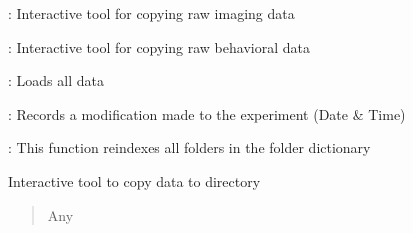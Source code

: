 \documentclass[letterpaper,10pt,english]{sphinxmanual}
\begin{document}
\begin{fulllineitems}
\begin{description}
\begin{DUlineblock}{0em}
\item[]  : Interactive tool for copying raw imaging data
\item[]  : Interactive tool for copying raw behavioral data
\item[]  : Loads all data
\item[]  :  Records a modification made to the experiment (Date \& Time)
\item[]  : This function re\sphinxhyphen{}indexes all folders in the folder dictionary
\end{DUlineblock}

\end{description}

\begin{fulllineitems}
\label{\detokenize{Organization:Organization.ImagingBehaviorExperiment.copy_data}}
\pysigstartsignatures
{}
\pysigstopsignatures
\sphinxAtStartPar
Interactive tool to copy data to directory
\begin{quote}\begin{description}
\sphinxAtStartPar
Any

\end{description}\end{quote}

\end{fulllineitems}


\begin{fulllineitems}
\label{\detokenize{Organization:Organization.ImagingBehaviorExperiment.load_data}}
\pysigstartsignatures
{}
\pysigstopsignatures\begin{quote}


\end{quote}
\end{fulllineitems}
\end{fulllineitems}
\end{document}
